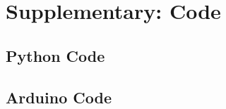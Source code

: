 \documentclass[12pt,a4paper]{article}
\begin{document}
\appendix
\section{Supplementary: Code}

\subsection{Python Code}





\subsection{Arduino Code}





\end{document}
